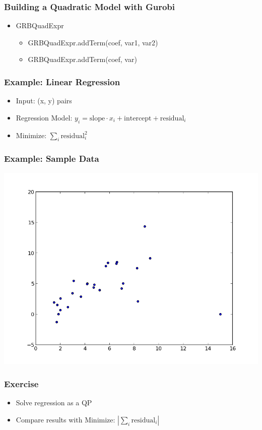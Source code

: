 \documentclass[12pt,handout]{beamer}
\begin{document}
\begin{frame}
\frametitle{Building a Quadratic Model with Gurobi}
\begin{itemize}
\item GRBQuadExpr
\begin{itemize}
\item GRBQuadExpr.addTerm(coef, var1, var2)
\end{itemize}

\begin{itemize}
\item GRBQuadExpr.addTerm(coef, var)
\end{itemize}
\end{itemize}
\end{frame}

\begin{frame}
\frametitle{Example: Linear Regression}
\begin{itemize}
  \item Input: (x, y) pairs
  \item Regression Model: $y_i = \mbox{slope} \cdot x_i + \mbox{intercept} + \mbox{residual}_i$
  \item Minimize: $\sum_i \mbox{residual}^2_i$
\end{itemize}
\end{frame}

\begin{frame}
\frametitle{Example: Sample Data}
\includegraphics[scale=0.5]{regression.png}
\end{frame}

{
\begin{frame}
  \frametitle{Exercise}
  \begin{itemize}
  \item Solve regression as a QP
  \item Compare results with Minimize: $|\sum_i \mbox{residual}_i|$
  \end{itemize}
\end{frame}
}
\end{document}
